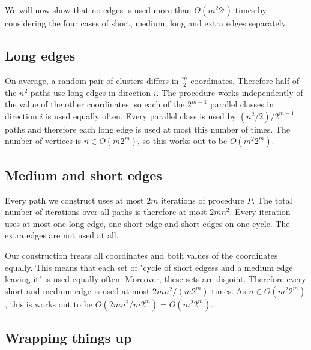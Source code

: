 We will now show that no edges is used more than $O(m^2 2^,)$ times by considering the four cases of short, medium, long
and extra edges separately.


\subsection{Long edges}

On average, a random pair of clusters differs in $\frac{m}{2}$ coordinates. Therefore half of the $n^2$ paths use long edges in direction $i$.
The procedure works independently of the value of the other coordinates. so each of the $2^{m-1}$ parallel classes in direction $i$ is used
equally often. Every parallel class is used by $(n^2/2) / 2^{m-1}$ paths and therefore each long edge is used at most this number of times. The number of vertices is $n \in O(m2^m)$, so this works out to be $O(m^2 2^m)$.

\subsection{Medium and short edges}

Every path we construct uses at most $2m$ iterations of procedure $P$. The total number of iterations over all paths is therefore at most
$2mn^2$.  Every iteration uses at most one long edge, one short edge and short edges
on one cycle. The extra edges are not used at all. 

Our construction treats all coordinates and both values of the coordinates equally. This means that 
each set of "cycle of short edgess and a medium edge leaving it"
is used equally often. Moreover, these sets are disjoint. Therefore every short and medium edge is used at most $2mn^2 / (m2^m)$ times. 
As $n \in O(m^2 2^m)$, this is works out to be $O(2mn^2 / m2^m) = O(m^2 2^m)$. 

\subsection{Wrapping things up}

